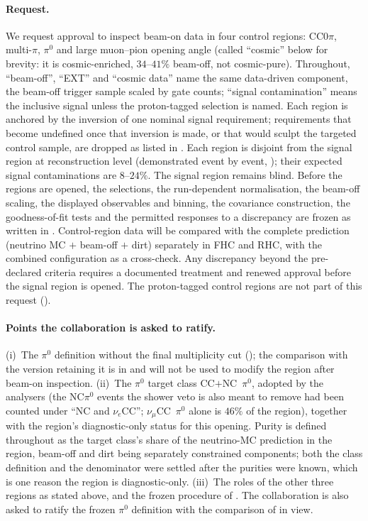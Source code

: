\paragraph{Request.}
We request approval to inspect beam-on data in four control regions: CC$0\pi$,
multi-$\pi$, $\pi^0$ and large muon--pion opening angle (called ``cosmic'' below for
brevity: it is cosmic-enriched, $34$--$41\%$ beam-off, not cosmic-pure).
Throughout, ``beam-off'', ``EXT'' and ``cosmic data'' name the same data-driven
component, the beam-off trigger sample scaled by gate counts; ``signal contamination''
means the inclusive signal unless the proton-tagged selection is named. Each region is
anchored by the inversion of one nominal signal requirement; requirements that become
undefined once that inversion is made, or that would sculpt the targeted control sample,
are dropped as listed in . Each region is disjoint from the
signal region at reconstruction level (demonstrated event by event,
); their expected signal contaminations are $8$--$24\%$. The
signal region remains blind. Before the regions are opened, the selections, the
run-dependent normalisation, the beam-off scaling, the displayed observables and binning,
the covariance construction, the goodness-of-fit tests and the permitted responses to a
discrepancy are frozen as written in . Control-region data will be
compared with the complete prediction (neutrino MC $+$ beam-off $+$ dirt) separately in
FHC and RHC, with the combined configuration as a cross-check. Any discrepancy beyond
the pre-declared criteria requires a documented treatment and renewed approval before
the signal region is opened. The proton-tagged control regions are not part of
this request ().

\paragraph{Points the collaboration is asked to ratify.}
(i)~The $\pi^0$ definition without the final multiplicity cut ();
the comparison with the version retaining it is in  and will
not be used to modify the region after beam-on inspection. (ii)~The $\pi^0$
target class CC$+$NC~$\pi^0$, adopted by the analysers (the NC$\pi^0$
events the shower veto is also meant to remove had been counted under ``NC and
$\nu_e$CC''; $\nu_\mu$CC~$\pi^0$ alone is $46\%$ of the region), together with the
region's diagnostic-only status for this opening. Purity is defined throughout as the
target class's share of the neutrino-MC prediction in the region, beam-off and
dirt being separately constrained components; both the class definition and the
denominator were settled after the purities were known, which is one reason the region
is diagnostic-only. (iii)~The roles of the other three regions as stated above, and the
frozen procedure of . The collaboration is also asked to ratify the frozen $\pi^0$ definition
with the comparison of  in view.

